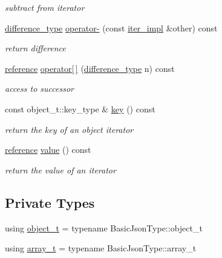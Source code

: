 \begin{DoxyCompactItemize}
\begin{DoxyCompactList}\small\item\em subtract from iterator \end{DoxyCompactList}\item 
\hyperlink{classnlohmann_1_1detail_1_1iter__impl_a2f7ea9f7022850809c60fc3263775840}{difference\+\_\+type} \hyperlink{classnlohmann_1_1detail_1_1iter__impl_a49bf3e708a9c1c88c415011735962d06}{operator-\/} (const \hyperlink{classnlohmann_1_1detail_1_1iter__impl}{iter\+\_\+impl} \&other) const
\begin{DoxyCompactList}\small\item\em return difference \end{DoxyCompactList}\item 
\hyperlink{classnlohmann_1_1detail_1_1iter__impl_a5be8001be099c6b82310f4d387b953ce}{reference} \hyperlink{classnlohmann_1_1detail_1_1iter__impl_ac0b9276f1102ed4b9cd3f5f56287e3ce}{operator\mbox{[}$\,$\mbox{]}} (\hyperlink{classnlohmann_1_1detail_1_1iter__impl_a2f7ea9f7022850809c60fc3263775840}{difference\+\_\+type} n) const
\begin{DoxyCompactList}\small\item\em access to successor \end{DoxyCompactList}\item 
const object\+\_\+t\+::key\+\_\+type \& \hyperlink{classnlohmann_1_1detail_1_1iter__impl_a15dfb2744fed2ef40c12a9e9a20d6dbc}{key} () const
\begin{DoxyCompactList}\small\item\em return the key of an object iterator \end{DoxyCompactList}\item 
\hyperlink{classnlohmann_1_1detail_1_1iter__impl_a5be8001be099c6b82310f4d387b953ce}{reference} \hyperlink{classnlohmann_1_1detail_1_1iter__impl_ab447c50354c6611fa2ae0100ac17845c}{value} () const
\begin{DoxyCompactList}\small\item\em return the value of an iterator \end{DoxyCompactList}\end{DoxyCompactItemize}
\subsection*{Private Types}
\begin{DoxyCompactItemize}
\item 
using \hyperlink{classnlohmann_1_1detail_1_1iter__impl_ab9a9598052e83fa14a2288e56d5dda7c}{object\+\_\+t} = typename Basic\+Json\+Type\+::object\+\_\+t
\item 
using \hyperlink{classnlohmann_1_1detail_1_1iter__impl_aef02cf75b1cb199286fd2f666c60e38e}{array\+\_\+t} = typename Basic\+Json\+Type\+::array\+\_\+t
\end{DoxyCompactItemize}
